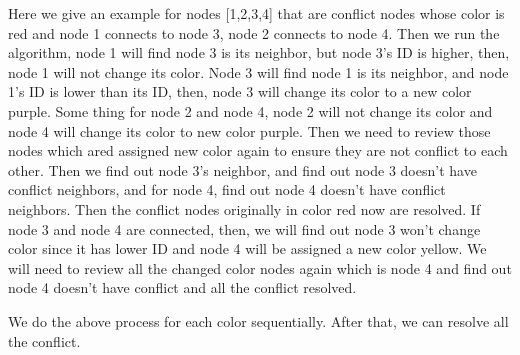 \documentclass[12pt] {article}
\begin{document}
Here we give an example for nodes [1,2,3,4] that are conflict nodes whose color is red and node 1 connects to node 3, node 2 connects to node 4. Then we run the algorithm, node 1 will find node 3 is its neighbor, but node 3's ID is higher, then, node 1 will not change its color. Node 3 will find node 1 is its neighbor, and node 1's ID is lower than its ID, then, node 3 will change its color to a new color purple. Some thing for node 2 and node 4, node 2 will not change its color and node 4 will change its color to new color purple. Then we need to review those nodes which ared assigned new color again to ensure they are not conflict to each other. Then we find out node 3's neighbor, and find out node 3 doesn't have conflict neighbors, and for node 4, find out node 4 doesn't have conflict neighbors. Then the conflict nodes originally in color red now are resolved. If node 3 and node 4 are connected, then, we will find out node 3 won't change color since it has lower ID and node 4 will be assigned a new color yellow. We will need to review all the changed color nodes again which is node 4 and find out node 4 doesn't have conflict and all the conflict resolved. 

We do the above process for each color sequentially. After that, we can resolve all the conflict. 
\end{document}
